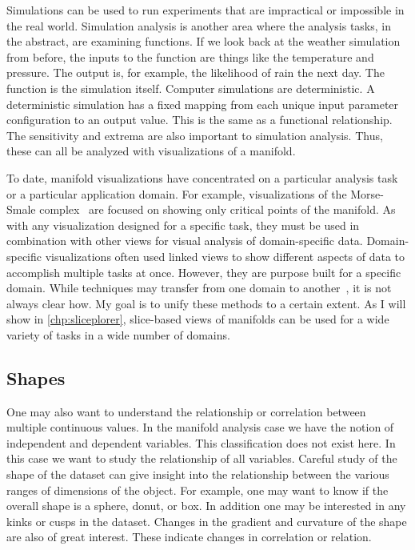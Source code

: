 Simulations can be used to run experiments that are impractical or impossible
in the real world.  Simulation analysis is another area where the analysis
tasks, in the abstract, are examining functions. If we look back at the weather
simulation from before, the inputs to the function are things like the
temperature and pressure.  The output is, for example, the likelihood of rain
the next day. The function is the simulation itself. Computer simulations are
deterministic.  A deterministic simulation has a fixed mapping from each unique
input parameter configuration to an output value. This is the same as a
functional relationship. The sensitivity and extrema are also important to
simulation analysis.  Thus, these can all be analyzed with visualizations of a
manifold.

To date, manifold visualizations have concentrated on a particular analysis
task or a particular application domain. For example, visualizations of the
Morse-Smale complex~\cite{Gerber:2010} are focused on showing only critical
points of the manifold. As with any visualization designed for a specific task,
they must be used in combination with other views for visual analysis of
domain-specific data. Domain-specific visualizations often used linked views to
show different aspects of data to accomplish multiple tasks at once. However,
they are purpose built for a specific domain. While techniques may transfer
from one domain to another~\cite{Sedlmair:2012}, it is not always clear how.
My goal is to unify these methods to a certain extent.  As I will show in
\autoref{chp:sliceplorer}, slice-based views of manifolds can be used for a
wide variety of tasks in a wide number of domains.

\subsection{Shapes}
\label{sec:shapes}

One may also want to understand the relationship or correlation between
multiple continuous values. In the manifold analysis case we have the notion
of independent and dependent variables. This classification does not exist 
here.
In this case
we want to study the relationship of all variables. Careful study of the shape
of the dataset can give insight into the relationship between the various
ranges of dimensions of the object. For example, one may want to know if the
overall shape is a sphere, donut, or box. In addition one may be interested in
any kinks or cusps in the dataset. Changes in the gradient and curvature of
the shape are also of great interest. These indicate changes in correlation or
relation.

